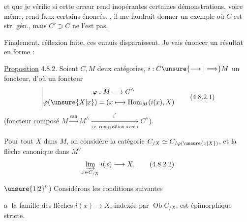 et que je vérifie si cette erreur 
 rend inopérantes certaines
démonstrations, voire même, rend faux certains
énoncés. , il me faudrait donner
un exemple où $C$ est str. gén., mais
$C'\supset C$ ne l'est pas.

Finalement, réflexion faite, ces ennuis 
disparaissent. Je vais énoncer un résultat
en forme :

\uline{Proposition} 4.8.2. Soient $C,M$ deux catégories,
$i:C\unsure{\longrightarrow|\Longrightarrow} M$ un foncteur, d'où un
foncteur
\[
\left|\begin{aligned}
\varphi &: M\longrightarrow C^\wedge\\
\varphi(\unsure{X|x})&=(x\longmapsto\operatorname{Hom}_M(i(x),X)
\end{aligned}\right.
\tag*{(4.8.2.1)}
\]
(foncteur composé $M\xrightarrow{\mathrm{can}}M^\wedge
\xrightarrow[\text{i.e. composition avec }i]{i^*}C^\wedge$).

Pour tout $X$ dans $M$, on considère la
 catégorie $C_{/X}\simeq C_{/\varphi(\unsure{x|X})}$, et la flèche
canonique dans  $M^\vee$
\[
\varinjlim_{x\in C_{/X}} i(x)\longrightarrow X\mathpunct{.}
\tag*{(4.8.2.2)}
\]

$\unsure{1|2}^{\mathrm{o}}$) Considérons les conditions suivantes

\textcircled{a}  la famille des flèches $i(x)\longrightarrow X$, indexée
par $\operatorname{Ob}C_{/X}$, est épimorphique stricte.
